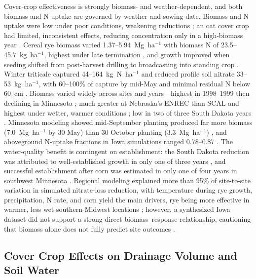 \documentclass[11pt]{article}
\begin{document}
Cover-crop effectiveness is strongly biomass- and weather-dependent, and both biomass and N uptake are governed by weather and sowing date. Biomass and N uptake were low under poor conditions, weakening reductions \parencite{PrezaFontes2021}; an oat cover crop had limited, inconsistent effects, reducing concentration only in a high-biomass year \parencite{OBrien2022}. Cereal rye biomass varied 1.37--5.94~Mg~ha$^{-1}$ with biomass N of 23.5--45.7~kg~ha$^{-1}$, highest under late termination \parencite{Gentry2025}, and growth improved when seeding shifted from post-harvest drilling to broadcasting into standing crop \parencite{Waring2024}. Winter triticale captured 44--164~kg~N~ha$^{-1}$ and reduced profile soil nitrate 33--53~kg~ha$^{-1}$, with 60--100\% of capture by mid-May and minimal residual N below 60~cm \parencite{Nance2007}. Biomass varied widely across sites and years---highest in 1998--1999 then declining in Minnesota \parencite{Strock2004}; much greater at Nebraska's ENREC than SCAL and highest under wetter, warmer conditions \parencite{Birru2023}; low in two of three South Dakota years \parencite{Bawa2023}. Minnesota modeling showed mid-September planting produced far more biomass (7.0~Mg~ha$^{-1}$ by 30 May) than 30 October planting (3.3~Mg~ha$^{-1}$) \parencite{Feyereisen2006b}, and aboveground N-uptake fractions in Iowa simulations ranged 0.78--0.87 \parencite{Malone2018}. The water-quality benefit is contingent on establishment: the South Dakota reduction was attributed to well-established growth in only one of three years \parencite{Bawa2023}, and successful establishment after corn was estimated in only one of four years in southwest Minnesota \parencite{Strock2004}. Regional modeling explained more than 95\% of site-to-site variation in simulated nitrate-loss reduction, with temperature during rye growth, precipitation, N rate, and corn yield the main drivers, rye being more effective in warmer, less wet southern-Midwest locations \parencite{Malone2014b}; however, a synthesized Iowa dataset did not support a strong direct biomass--response relationship, cautioning that biomass alone does not fully predict site outcomes \parencite{MartinezFeria2016}.

\subsection{Cover Crop Effects on Drainage Volume and Soil Water}
\end{document}
